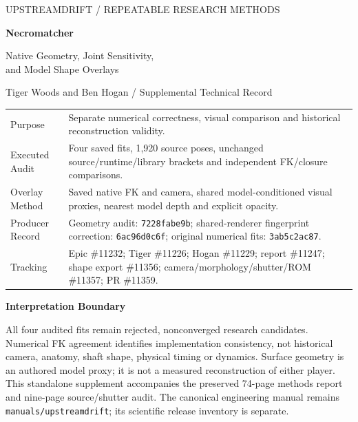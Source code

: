 \documentclass[11pt,letterpaper]{article}
\newcommand{\code}[1]{\nolinkurl{#1}}\newcommand{\hash}[1]{{\footnotesize\nolinkurl{#1}}}
\begin{document}
\hypersetup{pageanchor=false}
\begin{titlepage}\thispagestyle{empty}\vspace*{0.55in}
{\large\textcolor{accent}{UPSTREAMDRIFT / REPEATABLE RESEARCH METHODS}}\par\vspace{0.25in}
{\Huge\bfseries\textcolor{ink}{Necromatcher}}\par\vspace{0.18in}
{\LARGE Native Geometry, Joint Sensitivity,\\and Model Shape Overlays}\par\vspace{0.3in}
{\large Tiger Woods and Ben Hogan / Supplemental Technical Record}\par\vspace{0.35in}
\par\smallskip
\begin{tabular}{@{}p{1.3in}p{4.65in}@{}}\toprule
Purpose & Separate numerical correctness, visual comparison and historical reconstruction validity.\\
Executed Audit & Four saved fits, 1,920 source poses, unchanged source/runtime/library brackets and independent FK/closure comparisons.\\
Overlay Method & Saved native FK and camera, shared model-conditioned visual proxies, nearest model depth and explicit opacity.\\
Producer Record & Geometry audit: \code{7228fabe9b}; shared-renderer fingerprint correction: \code{6ac96d0c6f}; original numerical fits: \code{3ab5c2ac87}.\\
Tracking & Epic \#11232; Tiger \#11226; Hogan \#11229; report \#11247; shape export \#11356; camera/morphology/shutter/ROM \#11357; PR \#11359.\\\bottomrule
\end{tabular}
\vfill
\textcolor{ink}{\textbf{Interpretation Boundary}}\par
All four audited fits remain rejected, nonconverged research candidates.
Numerical FK agreement identifies implementation consistency, not historical
camera, anatomy, shaft shape, physical timing or dynamics. Surface geometry is
an authored model proxy; it is not a measured reconstruction of either player.
This standalone supplement accompanies the preserved 74-page methods report
and nine-page source/shutter audit. The canonical engineering manual remains
\code{manuals/upstreamdrift}; its scientific release inventory is separate.
\end{titlepage}
\hypersetup{pageanchor=true}
\end{document}
